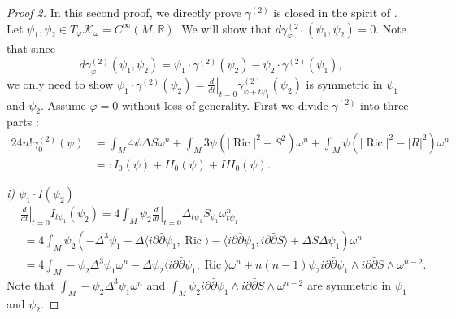 \documentclass[12pt,reqno,a4paper]{amsart}
\numberwithin{equation}{section}
\def\p{\partial}
\def\bp{\bar\partial}
\DeclareMathOperator{\ric}{Ric}
\theoremstyle{remark}
\theoremstyle{dotless}
\begin{document}
\begin{proof}[Proof 2]
In this second proof, we directly prove $\gamma^{(2)}$ is closed in the spirit of \cite{mabuchi1986k}. Let $\psi_1, \psi_2 \in T_{\varphi}\mathcal{K}_\omega=C^{\infty}(M,\mathbb{R})$. We will show that $d\gamma^{(2)}_\varphi(\psi_1,\psi_2)=0$. Note that since
\begin{equation*}
d\gamma^{(2)}_\varphi(\psi_1,\psi_2)=\psi_1\cdot\gamma^{(2)}(\psi_2)-\psi_2\cdot\gamma^{(2)}(\psi_1),
\end{equation*}
we only need to show $\psi_1\cdot\gamma^{(2)}(\psi_2)=\left.\frac{d}{dt}\right|_{t=0}\gamma^{(2)}_{\varphi+t\psi_1}(\psi_2)$ is symmetric in $\psi_1$ and $\psi_2$. Assume $\varphi=0$ without loss of generality. First we divide $\gamma^{(2)}$ into three parts :
\begin{align*}
24n!\gamma^{(2)}_0(\psi) &= \int_M 4\psi\Delta S \omega^n + \int_M 3\psi\left(|\ric|^2-S^2\right)\omega^n +\int_M \psi \left(|\ric|^2-|R|^2\right)\omega^n\\
&=:I_0(\psi)+II_0(\psi)+III_0(\psi).
\end{align*}

\textit{i) $\psi_1\cdot I(\psi_2)$}
\begin{align}\label{final1}
&\left.\frac{d}{dt}\right|_{t=0}I_{t\psi_1}(\psi_2)= 4\int_M \psi_2 \left.\frac{d}{dt}\right|_{t=0}\Delta_{t\psi_1} S_{\psi_1} \omega_{t\psi_1}^n  \nonumber\\
&\;= 4\int_M \psi_2 \left( -\Delta^3\psi_1 -\Delta\langle i\p\bp\psi_1,\ric \rangle-\langle i\p\bp\psi_1,i\p\bp S\rangle + \Delta S \Delta \psi_1\right)\omega^n \nonumber\\
&\;=4\int_M -\psi_2\Delta^3\psi_1 \omega^n -\Delta\psi_2\langle i\p\bp\psi_1,\ric \rangle\omega^n + n(n-1)\psi_2 i\p\bp\psi_1\wedge i\p\bp S\wedge\omega^{n-2}.
\end{align}
Note that $\int_M -\psi_2\Delta^3\psi_1 \omega^n$ and $\int_M \psi_2 i\p\bp\psi_1\wedge i\p\bp S\wedge\omega^{n-2}$ are symmetric in $\psi_1$ and $\psi_2$. 


\end{proof}
\end{document}
